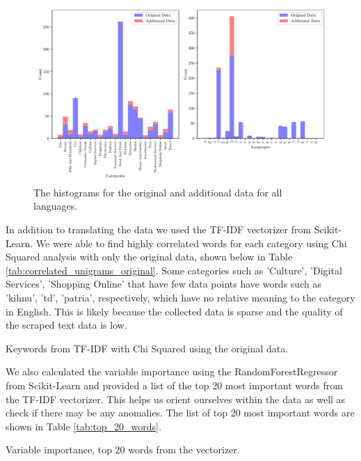 \begin{figure}[!ht]
  \centering
  \includegraphics[width=\textwidth]{../img/plot_all_hist.pdf}
  \caption{The histograms for the original and additional data for all languages.}
  \label{fig:all_hist}
\end{figure}


In addition to translating the data we used the TF-IDF vectorizer from Scikit-Learn. We were able to find highly correlated words for each category using Chi Squared analysis with only the original data, shown below in Table \ref{tab:correlated_unigrams_original}. Some categories such as 'Culture', 'Digital Services', 'Shopping Online' that have few data points have words such as 'kihnu', 'td', 'patria', respectively, which have no relative meaning to the category in English. This is likely because the collected data is sparse and the quality of the scraped text data is low.


\begin{table}[!ht]
\centering
\caption{Keywords from TF-IDF with Chi Squared using the original data.}

\label{tab:correlated_unigrams_original}
\end{table}


We also calculated the variable importance using the RandomForestRegressor from Scikit-Learn and provided a list of the top 20 most important words from the TF-IDF vectorizer. This helps us orient ourselves within the data as well as check if there may be any anomalies. The list of top 20 most important words are shown in Table \ref{tab:top_20_words}.


\begin{table}[!ht]
\centering
\caption{Variable importance, top 20 words from the vectorizer.}

\label{tab:top_20_words}
\end{table}



